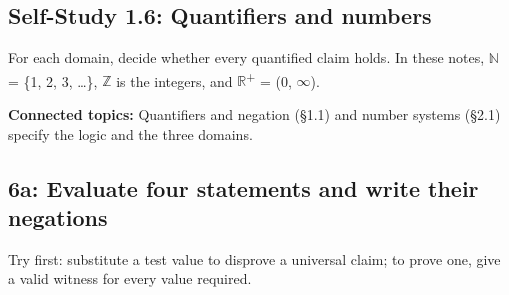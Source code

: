 \documentclass[11pt]{article}
\begin{document}
\begin{keepsection}
\section{Self-Study 1.6: Quantifiers and numbers}

For each domain, decide whether every quantified claim holds. In these notes, \ensuremath{\mathbb{N}} = \{1, 2, 3, …\}, \ensuremath{\mathbb{Z}} is the integers, and \ensuremath{\mathbb{R}}\textsuperscript{+} = (0, \ensuremath{\infty}).

\textbf{Connected topics:} Quantifiers and negation (§1.1) and number systems (§2.1) specify the logic and the three domains.

\begin{keepsection}
\subsection{6a: Evaluate four statements and write their negations}

Try first: substitute a test value to disprove a universal claim; to prove one, give a valid witness for every value required.

\end{keepsection}
\end{keepsection}


\clearpage
\end{document}

